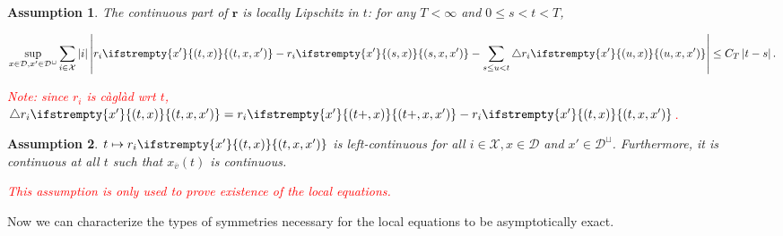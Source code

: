 \documentclass[12pt]{article}
\newcommand{\mc}{\mathcal}
\newcommand{\ov}{\overline}
\newcommand{\tr}{\textcolor{red}}
\newcommand{\cad}{\mc{D}}							%
\newcommand{\sta}{\mc{X}}							%
\newcommand{\cl}[1]{\ov{#1}}						%
\newcommand{\rate}{r}								%
\newcommand{\xf}{x}									%
\newcommand{\delt}{\triangle}						%
\newcommand{\vind}[1]{_{#1}}						%
\newcommand{\tme}[1]{(#1)}							%
\newcommand{\stpara}[1]{_{#1}}						%
\newcommand{\rateset}{\mathbf{\rate}}				%
\newcommand{\jumpbd}[1]{C_{#1}}						%
\newcommand{\tmepro}[3]{
\ifstrempty{#3}{
	(#1,#2)}{
	(#1,#2,#3)}}									%
\newtheorem{assu}{Assumption}
\begin{document}
\begin{assu}
The continuous part of \(\rateset\) is locally Lipschitz in \(t\): for any \(T < \infty\) and \(0\leq s < t < T\),

\begin{equation}
\sup_{\xf \in \cad, \xf'\in \cad^\sqcup} \sum_{i\in \sta}|i|\left|\rate\stpara{i}\tmepro{t}{\xf}{\xf'} - \rate\stpara{i}\tmepro{s}{\xf}{\xf'} - \sum_{s\leq u < t} \delt \rate\stpara{i}\tmepro{u}{\xf}{\xf'}\right| \leq \jumpbd{T}\left|t - s\right|.
\label{a::tLipschitz}
\end{equation}

\tr{Note: since \(\rate\stpara{i}\) is c\`agl\`ad wrt \(t\), \(\delt\rate\stpara{i}\tmepro{t}{\xf}{\xf'} = \rate\stpara{i}\tmepro{t+}{\xf}{\xf'} - \rate\stpara{i}\tmepro{t}{\xf}{\xf'}\).}
\label{a::liprt}
\end{assu}

\begin{assu}
\(t\mapsto \rate\stpara{i}\tmepro{t}{\xf}{\xf'}\) is left-continuous for all \(i\in \sta,\xf\in \cad\) and \(\xf'\in \cad^\sqcup\). Furthermore, it is continuous at all \(t\) such that \(\xf\vind{\cl{v}}\tme{t}\) is continuous. 

\tr{This assumption is only used to prove existence of the local equations.}
\label{a::lctr}
\end{assu}

Now we can characterize the types of symmetries necessary for the local equations to be asymptotically exact.
\end{document}
